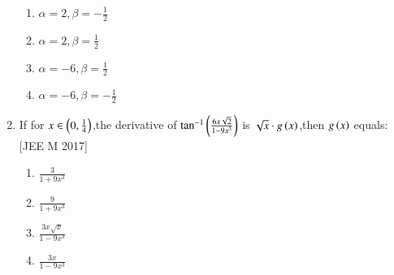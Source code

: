 \documentclass[journal,12pt,twocolumn]{IEEEtran}
\theoremstyle{remark}
\begin{document}
\begin{enumerate}
\begin{multicols}{2}
       
	      \begin{enumerate}
		      \item $\alpha=2,\beta=-\frac{1}{2}$
		      \item $\alpha=2,\beta=\frac{1}{2}$
		      \item $\alpha=-6,\beta=\frac{1}{2}$
		      \item $\alpha=-6,\beta=-\frac{1}{2}$
	      \end{enumerate}
       \end{multicols}
      \item If for $x\in\left(0,\frac{1}{4}\right)$,the derivative of $\tan^{-1}\left(\frac{6x\sqrt{2}}{1-9x^3}\right)$ is $\sqrt{x}\cdot g\left(x\right)$,then $g\left(x\right)$ equals:
	      \hfill[JEE M 2017]
       \begin{multicols}{2}
           
    
	      \begin{enumerate}
		      \item $\frac{3}{1+9x^3}$
		      \item $\frac{9}{1+9x^3}$
		      \item $\frac{3x\sqrt{x}}{1-9x^3}$
		      \item $\frac{3x}{1-9x^3}$
        
	      \end{enumerate}
       \end{multicols}
	      \end{enumerate}
	      
\end{document}
